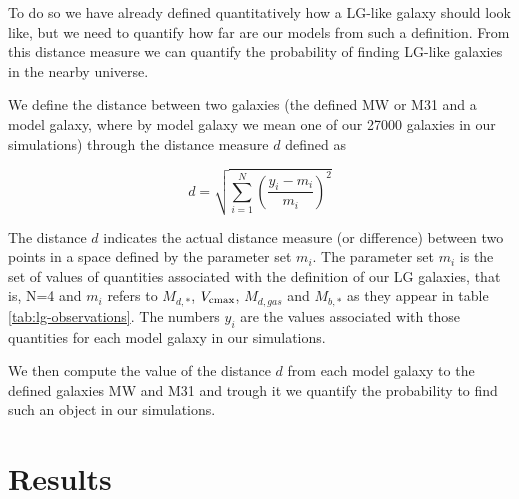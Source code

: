 \documentclass[useAMS,usenatbib]{mn2e}
\begin{document}
To do so we have already defined quantitatively how a LG-like galaxy
should look like, but we need to quantify how far are our models from
such a definition. From this distance measure we can quantify the
probability of finding LG-like galaxies in the nearby universe.

We define the distance between two galaxies (the defined MW or M31 and
a model galaxy, where by model galaxy we mean one of our 27000
galaxies in our simulations) through the distance measure $d$ defined
as

\begin{equation}
  d = \sqrt{ \sum_{i=1}^N \left( \frac{y_i - m_i}{m_i} \right)^2 }
  \label{eq:distance}
\end{equation}

The distance $d$ indicates the actual distance measure (or difference)
between two points in a space defined by the parameter set $m_i$. The
parameter set $m_i$ is the set of values of quantities associated with
the definition of our LG galaxies, that is, N=4 and $m_i$ refers to
$M_{d,*}$, $V_{\rm cmax}$, $M_{d,gas}$ and $M_{b,*}$ as they appear in
table \ref{tab:lg-observations}. The numbers $y_i$ are the values
associated with those quantities for each model galaxy in our
simulations.

We then compute the value of the distance $d$ from each model galaxy
to the defined galaxies MW and M31 and trough it we quantify the
probability to find such an object in our simulations.



\section{Results}
\label{sec:results}
\end{document}
